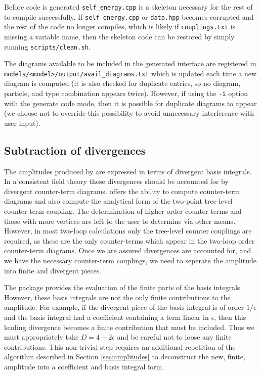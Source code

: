 Before code is generated \lstinline{self_energy.cpp} is a skeleton necessary for the rest of \mb to compile successfully.  If \lstinline{self_energy.cpp} or \lstinline{data.hpp} becomes corrupted and the rest of the code no longer compiles, which is likely if \lstinline{couplings.txt} is missing a variable name, then the skeleton code can be restored by simply running \lstinline{scripts/clean.sh}.

The diagrams available to be included in the generated \tsil interface are registered in \lstinline{models/<model>/output/avail_diagrams.txt} which is updated each time a new diagram is computed (it is also checked for duplicate entries, so no diagram, particle, and type combination appears twice).  However, if using the \lstinline{-i} option with the generate code mode, then it is possible for duplicate diagrams to appear (we choose not to override this possibility to avoid unnecessary interference with user input).

\subsection{Subtraction of divergences}\label{sec:divergences}

The amplitudes produced by \tarcer are expressed in terms of divergent basis integrals.  In a consistent field theory these divergences should be accounted for by divergent counter-term diagrams.  \mb offers the ability to compute counter-term diagrams and also compute the analytical form of the two-point tree-level counter-term coupling.  The determination of higher order counter-terms and those with more vertices are left to the user to determine via other means.  However, in most two-loop calculations only the tree-level counter couplings are required, as these are the only counter-terms which appear in the two-loop order counter-term diagrams.  Once we are assured divergences are accounted for, and we have the necessary counter-term couplings, we need to seperate the amplitude into finite and divergent pieces.

The \tsil package provides the evaluation of the finite parts of the basis integrals.  However, these basis integrals are not the only finite contributions to the amplitude.  For example, if the divergent piece of the basis integral is of order $1/\epsilon$ and the basis integral had a coefficient containing a term linear in $\epsilon$, then this leading divergence becomes a finite contribution that must be included.  Thus we must appropriately take $D=4-2\epsilon$ and be careful not to loose any finite contributions.  This non-trivial step requires an additional repetition of the algorithm described in Section \ref{sec:amplitudes} to deconstruct the new, finite, amplitude into a coefficient and basis integral form.

